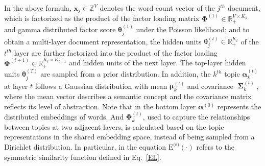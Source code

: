\documentclass{article}
\newcommand{\xv}[0]{\ensuremath{\boldsymbol{x}} }
\newcommand{\Sigmamat}[0]{\ensuremath{\boldsymbol{\Sigma}} }
\begin{document}
In the above formula, $\xv_j\in\mathbb{Z}^{V}$ denotes the word count vector of the $j^{th}$ document, which is factorized as the product of the factor loading matrix $\bm{\Phi}^{(1)}\in\mathbb{R}_+ ^{V\times K_{1}}$ and gamma distributed factor score $\bm{\theta}_j^{(1)}$ under the Poisson likelihood; and to obtain a multi-layer document representation, the hidden units $\bm{\theta}_j^{(t)}\in\mathbb{R}^{K_t}_+$ of the $t^{th}$ layer are further factorized into the product of the factor loading $\bm{\Phi}^{(t+1)}\in\mathbb{R}_+^{K_{t} \times K_{t+1}}$ and hidden units of the next layer. The top-layer hidden units $\bm{\theta}_j^{(T)}$ are sampled from a prior distribution. In addition, the $k^{th}$ topic $\bm{\alpha}^{(t)}_k$ at layer $t$ follows a Gaussian distribution with mean $\bm{\mu}_k^{\left(t\right)}$ and covariance $\mathop{\Sigmamat}\nolimits_k^{\left(t\right)}$, where the mean vector describes a semantic concept and the covariance matrix reflects its level of abstraction. Note that in the bottom layer $\bm{\alpha}^{(0)}$ represents the distributed embeddings of words. And $\bm{\Phi}^{(t)}_k$,  used to capture the relationships between topics at two adjacent layers, is calculated based on the topic representations in the shared embedding space, instead of being sampled from a Dirichlet distribution. In particular, in the equation ${\mbox{E}^{\text{(s)}}}(\cdot)$ refers to the symmetric similarity function defined in Eq.~\eqref{EL}.  


\end{document}
